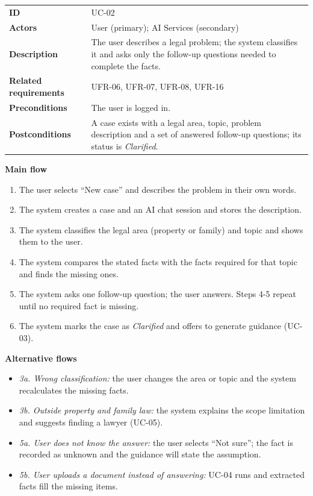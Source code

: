 \begin{center}
\begin{tabular}{|L{2.99cm}|L{11.94cm}|}
\hline\headrow {} &  \\ \hline
\textbf{ID} & UC-02 \\ \hline
\textbf{Actors} & User (primary); AI Services (secondary) \\ \hline
\textbf{Description} & The user describes a legal problem; the system classifies it and asks only the follow-up questions needed to complete the facts. \\ \hline
\textbf{Related requirements} & UFR-06, UFR-07, UFR-08, UFR-16 \\ \hline
\textbf{Preconditions} & The user is logged in. \\ \hline
\textbf{Postconditions} & A case exists with a legal area, topic, problem description and a set of answered follow-up questions; its status is \emph{Clarified}. \\ \hline
\end{tabular}
\end{center}

\textbf{Main flow}

\begin{enumerate}
  \item The user selects ``New case'' and describes the problem in their own words.
  \item The system creates a case and an AI chat session and stores the description.
  \item The system classifies the legal area (property or family) and topic and shows them to the user.
  \item The system compares the stated facts with the facts required for that topic and finds the missing ones.
  \item The system asks one follow-up question; the user answers. Steps 4-5 repeat until no required fact is missing.
  \item The system marks the case as \emph{Clarified} and offers to generate guidance (UC-03).
\end{enumerate}

\textbf{Alternative flows}

\begin{itemize}
  \item \emph{3a. Wrong classification:} the user changes the area or topic and the system recalculates the missing facts.
  \item \emph{3b. Outside property and family law:} the system explains the scope limitation and suggests finding a lawyer (UC-05).
  \item \emph{5a. User does not know the answer:} the user selects ``Not sure''; the fact is recorded as unknown and the guidance will state the assumption.
  \item \emph{5b. User uploads a document instead of answering:} UC-04 runs and extracted facts fill the missing items.
\end{itemize}

